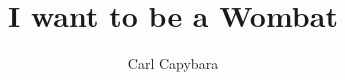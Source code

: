 \documentclass[a4paper, 12pt]{report}
\begin{document}
\title{I want to be a Wombat}
\author{Carl Capybara}
\maketitle
\end{document}
